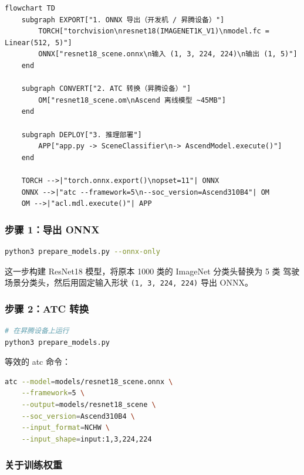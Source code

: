 \begin{lstlisting}
flowchart TD
    subgraph EXPORT["1. ONNX 导出（开发机 / 昇腾设备）"]
        TORCH["torchvision\nresnet18(IMAGENET1K_V1)\nmodel.fc = Linear(512, 5)"]
        ONNX["resnet18_scene.onnx\n输入 (1, 3, 224, 224)\n输出 (1, 5)"]
    end

    subgraph CONVERT["2. ATC 转换（昇腾设备）"]
        OM["resnet18_scene.om\nAscend 离线模型 ~45MB"]
    end

    subgraph DEPLOY["3. 推理部署"]
        APP["app.py -> SceneClassifier\n-> AscendModel.execute()"]
    end

    TORCH -->|"torch.onnx.export()\nopset=11"| ONNX
    ONNX -->|"atc --framework=5\n--soc_version=Ascend310B4"| OM
    OM -->|"acl.mdl.execute()"| APP
\end{lstlisting}

\subsubsection{步骤 1：导出 ONNX}\label{src-experiment-case6-h16}

\begin{lstlisting}[language=bash]
python3 prepare_models.py --onnx-only
\end{lstlisting}

这一步构建 ResNet18 模型，将原本 1000 类的 ImageNet 分类头替换为 5 类
驾驶场景分类头，然后用固定输入形状
\passthrough{\lstinline!(1, 3, 224, 224)!} 导出 ONNX。

\subsubsection{步骤 2：ATC 转换}\label{src-experiment-case6-h17}

\begin{lstlisting}[language=bash]
# 在昇腾设备上运行
python3 prepare_models.py
\end{lstlisting}

等效的 atc 命令：

\begin{lstlisting}[language=bash]
atc --model=models/resnet18_scene.onnx \
    --framework=5 \
    --output=models/resnet18_scene \
    --soc_version=Ascend310B4 \
    --input_format=NCHW \
    --input_shape=input:1,3,224,224
\end{lstlisting}

\subsubsection{关于训练权重}\label{src-experiment-case6-h18}


